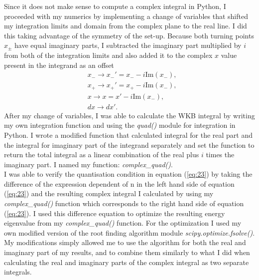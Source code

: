 \documentclass[10pt, a4paper, singlespacing, headsepline]{article}
\begin{document}
Since it does not make sense to compute a complex integral in Python, I proceeded with my numerics by implementing a change of variables that shifted my integration limits and domain from the complex plane to the real line. I did this taking advantage of the symmetry of the set-up. Because both turning points $x_{\pm}$ have equal imaginary parts, I subtracted the imaginary part multiplied by $i$ from both of the integration limits and also added it to the complex $x$ value present in the integrand as an offset
\begin{equation} \label{eq:24}
\begin{split}
&x_{-}\rightarrow x_{-}' = x_{-} - i \mathrm{Im}(x_{-}),\\
&x_{+}\rightarrow x_{+}' = x_{+} - i \mathrm{Im}(x_{-}),\\
&x\rightarrow x = x' - i \mathrm{Im}(x_{-}),\\
&dx\rightarrow dx'.
\end{split}
\end{equation}
After my change of variables, I was able to calculate the WKB integral by writing my own integration function and using the \textit{quad()} module for integration in Python. I wrote a modified function that calculated integral for the real part and the integral for imaginary part of the integrand separately and set the function to return the total integral as a linear combination of the real plus $i$ times the imaginary part. I named my function: \textit{complex\_quad()}.\\
I was able to verify the quantisation condition in equation (\ref{eq:23}) by taking the difference of the expression dependent of n in the left hand side of equation (\ref{eq:23}) and the resulting complex integral I calculated by using my \textit{complex\_quad()} function which corresponds to the right hand side of equation (\ref{eq:23}). I used this difference equation to optimize the resulting energy eigenvalue from my \textit{complex\_quad()} function. For the optimization I used my own modified version of the root finding algorithm module \textit{scipy.optimize.fsolve()}. My modifications simply allowed me to use the algorithm for both the real and imaginary part of my results, and to combine them similarly to what I did when calculating the real and imaginary parts of the complex integral as two separate integrals.
\end{document}
